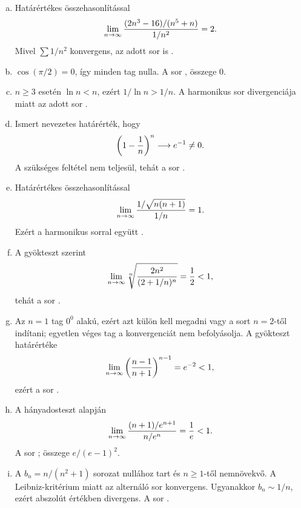 \documentclass{szb-solution}
\begin{document}
\begin{enumerate}[a)]
  \item Határértékes összehasonlítással
        $$
          \lim_{n\to\infty}
          \frac{(2n^3-16)/(n^5+n)}{1/n^2}=2
          \text.
        $$
        Mivel $\sum1/n^2$ konvergens, az adott sor is
        .

  \item $\cos(\pi/2)=0$, így minden tag nulla. A sor
        , összege $0$.

  \item $n\geq3$ esetén $\ln n<n$, ezért
        $1/\ln n>1/n$. A harmonikus sor divergenciája miatt az adott sor
        .

  \item Ismert nevezetes határérték, hogy
        $$
          \left(1-\frac1n\right)^n\longrightarrow e^{-1}\neq0
          \text.
        $$
        A szükséges feltétel nem teljesül, tehát a sor
        .

  \item Határértékes összehasonlítással
        $$
          \lim_{n\to\infty}
          \frac{1/\sqrt{n(n+1)}}{1/n}=1
          \text.
        $$
        Ezért a harmonikus sorral együtt .

  \item A gyökteszt szerint
        $$
          \lim_{n\to\infty}
          \sqrt[n]{\frac{2n^2}{(2+1/n)^n}}
          =\frac12<1
          \text,
        $$
        tehát a sor .

  \item Az $n=1$ tag $0^0$ alakú, ezért azt külön kell megadni vagy a sort
        $n=2$-től indítani; egyetlen véges tag a konvergenciát nem befolyásolja.
        A gyökteszt határértéke
        $$
          \lim_{n\to\infty}
          \left(\frac{n-1}{n+1}\right)^{n-1}=e^{-2}<1
          \text,
        $$
        ezért a sor .

  \item A hányadosteszt alapján
        $$
          \lim_{n\to\infty}
          \frac{(n+1)/e^{n+1}}{n/e^n}=\frac1e<1
          \text.
        $$
        A sor ; összege
        $e/(e-1)^2$.

  \item A $b_n=n/(n^2+1)$ sorozat nullához tart és $n\geq1$-től
        nemnövekvő. A Leibniz-kritérium miatt az alternáló sor konvergens.
        Ugyanakkor $b_n\sim1/n$, ezért abszolút értékben divergens. A sor
        .


\end{enumerate}
\end{document}
